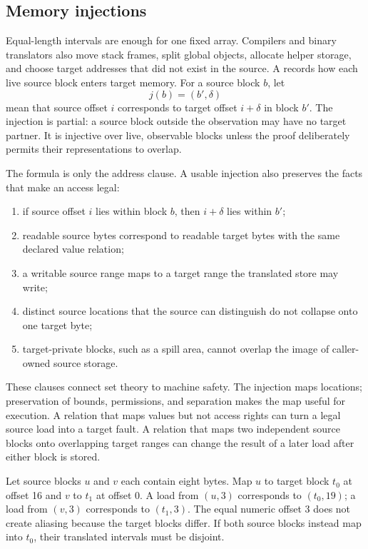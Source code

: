 \subsection{Memory injections}

Equal-length intervals are enough for one fixed array. Compilers and binary
translators also move stack frames, split global objects, allocate helper
storage, and choose target addresses that did not exist in the source. A
 records how each live source block enters target
memory. For a source block \(b\), let
\[
  j(b)=(b',\delta)
\]
mean that source offset \(i\) corresponds to target offset \(i+\delta\) in
block \(b'\). The injection is partial: a source block outside the observation
may have no target partner. It is injective over live, observable blocks unless
the proof deliberately permits their representations to overlap.

The formula is only the address clause. A usable injection also preserves the
facts that make an access legal:

\begin{enumerate}
\item if source offset \(i\) lies within block \(b\), then \(i+\delta\) lies
within \(b'\);
\item readable source bytes correspond to readable target bytes with the same
declared value relation;
\item a writable source range maps to a target range the translated store may
write;
\item distinct source locations that the source can distinguish do not
collapse onto one target byte;
\item target-private blocks, such as a spill area, cannot overlap the image of
caller-owned source storage.
\end{enumerate}

These clauses connect set theory to machine safety. The injection maps
locations; preservation of bounds, permissions, and separation makes the map
useful for execution. A relation that maps values but not access rights can
turn a legal source load into a target fault. A relation that maps two
independent source blocks onto overlapping target ranges can change the result
of a later load after either block is stored.

\begin{example}[title={Two source blocks move without becoming aliases}]
Let source blocks \(u\) and \(v\) each contain eight bytes. Map \(u\) to target
block \(t_0\) at offset 16 and \(v\) to \(t_1\) at offset 0. A load from
\((u,3)\) corresponds to \((t_0,19)\); a load from \((v,3)\) corresponds to
\((t_1,3)\). The equal numeric offset 3 does not create aliasing because the
target blocks differ. If both source blocks instead map into \(t_0\), their
translated intervals must be disjoint.
\end{example}

